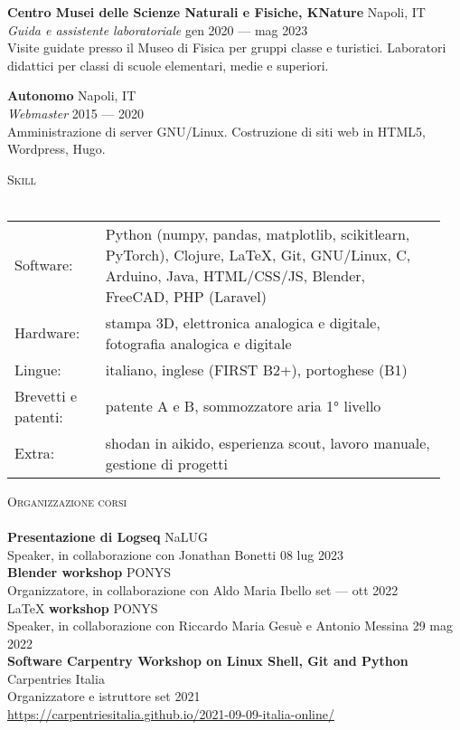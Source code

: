 \documentclass[a4paper]{article}
\newcommand{\lineunder} {
  \vspace*{-8pt} \\
  \hspace*{-18pt} \hrulefill \\
}
\newcommand{\header} [1] {
  {\hspace*{-18pt}\vspace*{6pt} \textsc{#1}}
  \vspace*{-6pt} \lineunder
}
\begin{document}
\textbf{Centro Musei delle Scienze Naturali e Fisiche, KNature} \hfill Napoli, IT \\
\textit{Guida e assistente laboratoriale} \hfill gen 2020 --- mag 2023 \\
Visite guidate presso il Museo di Fisica per gruppi classe e turistici.
Laboratori didattici per classi di scuole elementari, medie e superiori.
\vspace{5mm}

\textbf{Autonomo} \hfill Napoli, IT \\
\textit{Webmaster}
\hfill 2015 --- 2020\\
Amministrazione di server GNU/Linux.
Costruzione di siti web in HTML5, Wordpress, Hugo. \\
\vspace{2mm}

\header{Skill}
\begin{tabular}{ p{0.2\linewidth} p{0.75\linewidth} }
  Software: & Python (numpy, pandas, matplotlib, scikitlearn, PyTorch),
              Clojure, LaTeX, Git, GNU/Linux,
              C, Arduino, Java, HTML/CSS/JS,
              Blender, FreeCAD, PHP (Laravel) \\
  Hardware: & stampa 3D,
              elettronica analogica e digitale,
              fotografia analogica e digitale  \\
  Lingue:   & italiano,
              inglese (FIRST B2+),
              portoghese (B1) \\
  Brevetti e patenti: & patente A e B,
                        sommozzatore aria 1° livello \\
  Extra: & shodan in aikido,
           esperienza scout,
           lavoro manuale,
           gestione di progetti
\end{tabular}
\vspace{2mm}

\header{Organizzazione corsi}
\textbf{Presentazione di Logseq} \hfill NaLUG \\
Speaker, in collaborazione con Jonathan Bonetti \hfill 08 lug 2023 \\
\vspace*{2mm}
\textbf{Blender workshop} \hfill PONYS \\
Organizzatore, in collaborazione con Aldo Maria Ibello \hfill set --- ott 2022 \\
\vspace*{2mm}
\LaTeX{} \textbf{workshop} \hfill PONYS \\
Speaker, in collaborazione con Riccardo Maria Gesuè e Antonio Messina \hfill 29 mag 2022 \\
\vspace*{2mm}
\textbf{Software Carpentry Workshop on Linux Shell, Git and Python} \hfill Carpentries Italia \\
Organizzatore e istruttore \hfill set 2021 \\
\url{https://carpentriesitalia.github.io/2021-09-09-italia-online/} \\
\vspace*{2mm}
\end{document}
